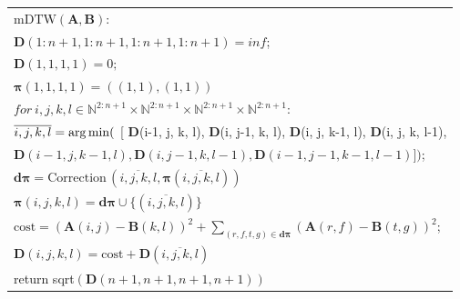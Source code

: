 \begin{multicols}{2}
\setcounter{figure}{3}
\begin{figure*} %
{\small 
\begin{center}
\begin{tabular}{l}
\hline
$\mathrm{mDTW}\left(\textbf{A},\textbf{B}\right):$\\
\hspace*{3mm}$\textbf{D}(1:n+1,1:n+1, 1:n+1, 1:n+1) = inf$;\\
\hspace*{3mm}$\textbf{D}(1,1,1,1) = 0;$\\
\hspace*{3mm}$\boldsymbol{\pi}(1,1,1,1) = ((1,1),(1,1))$\\
\hspace*{3mm}$for\ i,j,k,l  \in \mathbb{N}^{2 : n+1} \times 
\mathbb{N}^{2 : n+1} \times \mathbb{N}^{2 : n+1} \times \mathbb{N}^{2 : n+1}:$\\
\hspace*{6mm}$\overline{i,j,k,l} = \mathop{\mathrm{arg}\,\mathrm{min}}($ [ \textbf{D}(i-1, j, k, l), 
\textbf{D}(i, j-1, k, l), \textbf{D}(i, j, k-1, l), 
\textbf{D}(i, j, k, l-1),    \\
\hspace*{9mm}$\textbf{D}(i-1, j, k-1, l), \textbf{D}(i, j-1, k, l-1), 
\textbf{D}(i-1, j-1, k-1, l-1) ])$;\\
\hspace*{3mm}$\boldsymbol{d \pi} = \mathrm{Correction}\,(\overline{i,j,k,l}, 
\boldsymbol{\pi}(\overline{i,j,k,l}))$\\
\hspace*{3mm}$\boldsymbol{\pi}(i, j, k, l) = \boldsymbol{d \pi} \cup 
\{(\overline{i,j,k,l})\}$\\
\hspace*{3mm}$\mathrm{cost} = (\textbf{A}(i, j)-\textbf{B}(k, l))^2 + 
\sum\nolimits_{(r,f,t,g) \in \boldsymbol{d \pi}}
(\textbf{A}(r, f)-\textbf{B}(t, g))^2$;\\
\hspace*{3mm}$\textbf{D}(i,j,k,l) = \mathrm{cost} + \textbf{D}
(\overline{i,j,k,l})$\\
return  sqrt$(\textbf{D}(n+1,n+1,n+1,n+1))$\\
\hline
\end{tabular}
\end{center}
}
\vspace*{-9pt}

\end{figure*}


\end{multicols}
